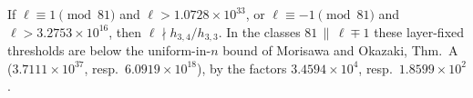 If $\ell\equiv1\pmod{81}$ and $\ell>1.0728\times10^{33}$, or $\ell\equiv-1\pmod{81}$ and $\ell>3.2753\times10^{16}$, then $\ell\nmid h_{3,4}/h_{3,3}$. In the classes $81\,\|\,\ell\mp1$ these layer-fixed thresholds are below the uniform-in-$n$ bound of Morisawa and Okazaki, \cite{MO16} Thm.~A ($3.7111\times10^{37}$, resp.\ $6.0919\times10^{18}$), by the factors $3.4594\times10^{4}$, resp.\ $1.8599\times10^{2}$.

